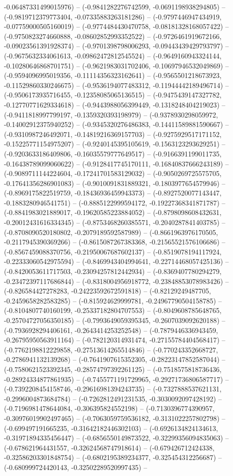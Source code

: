 -0.06487331499015976) -- (-0.9841282276742599, -0.0691198938294805) -- (-0.9819712379773404, -0.07335883263181286) -- (-0.9797446947434919, -0.07759000505160019) -- (-0.9774484430470758, -0.08181328168057422) -- (-0.9750823274660888, -0.08602852993352522) -- (-0.9726461919672166, -0.09023561391928374) -- (-0.9701398798006293, -0.09443439429793797) -- (-0.9675632334061613, -0.09862472812545524) -- (-0.9649160943324144, -0.10280646868701751) -- (-0.9621983031702406, -0.10697946532049869) -- (-0.9594096995019356, -0.11114356323162641) -- (-0.9565501218673923, -0.11529860330246675) -- (-0.9536194077483312, -0.11944442189496714) -- (-0.9506173935716455, -0.12358085065136515) -- (-0.9475439147327782, -0.12770771629334618) -- (-0.9443988056399449, -0.1318248404219023) -- (-0.9411818997799197, -0.1359320393198979) -- (-0.9378930298059972, -0.14002912375940252) -- (-0.9345320276486383, -0.14411589881590667) -- (-0.9310987246492071, -0.14819216369157703) -- (-0.9275929517171152, -0.15225771154975207) -- (-0.9240145395105619, -0.1563123293629251) -- (-0.9203633186409806, -0.16035579777649517) -- (-0.9166391199011735, -0.16438789099060622) -- (-0.9128417745170111, -0.16840837666243189) -- (-0.9089711144224604, -0.17241701583129032) -- (-0.9050269725575705, -0.17641356286901083) -- (-0.9010091831889321, -0.1803977654579946) -- (-0.8969175822519759, -0.18436936459943373) -- (-0.8927520077143447, -0.1883280946541751) -- (-0.8885122999594172, -0.19227368341871787) -- (-0.8841983021889017, -0.19620585223884052) -- (-0.8798098608432631, -0.20012431616334345) -- (-0.8753468260385571, -0.2040287841403785) -- (-0.8708090520180802, -0.2079189592587989) -- (-0.8661963976170505, -0.2117945390369266) -- (-0.8615087267383368, -0.21565521576106686) -- (-0.8567459088370756, -0.21950067687602137) -- (-0.8519078194117924, -0.22333060542975594) -- (-0.8469943404994641, -0.22714468057425136) -- (-0.8420053611717503, -0.23094257812442934) -- (-0.8369407780294279, -0.23472397117686844) -- (-0.8318004956918772, -0.23848853078983426) -- (-0.826584427278283, -0.24223592672591818) -- (-0.82129249487705, -0.2459658282583285) -- (-0.815924629999781, -0.24967790504158785) -- (-0.8104807740160199, -0.25337182804707553) -- (-0.8049608785648765, -0.25704727056350185) -- (-0.7993649059395345, -0.2607039092620188) -- (-0.7936928294406161, -0.2643414253252548) -- (-0.7879446336943459, -0.26795950563911164) -- (-0.782120314931474, -0.27155784404568417) -- (-0.7762198812229858, -0.27513614265514846) -- (-0.770243352668727, -0.2786941132139268) -- (-0.7641907615352305, -0.28223147852587044) -- (-0.7580621523392345, -0.28574797392261125) -- (-0.7518575818736436, -0.28924334877861935) -- (-0.7455771191729965, -0.29271736806587717) -- (-0.7392208454158746, -0.29616981394243735) -- (-0.7327888537621131, -0.2996004873684784) -- (-0.7262812491231535, -0.3030092097428192) -- (-0.7196981478644084, -0.306395824552198) -- (-0.7130396774390957, -0.30976019902497465) -- (-0.7063059759536182, -0.3131022257802798) -- (-0.699497191665235, -0.31642182446302103) -- (-0.6926134824134613, -0.31971894335456447) -- (-0.6856550149873522, -0.32299356094835063) -- (-0.678621964431557, -0.32624568747918614) -- (-0.679426712424338, -0.32586203301848754) -- (-0.6802195389234377, -0.325454312256687) -- (-0.680999724420143, -0.32502289520997435) -- 